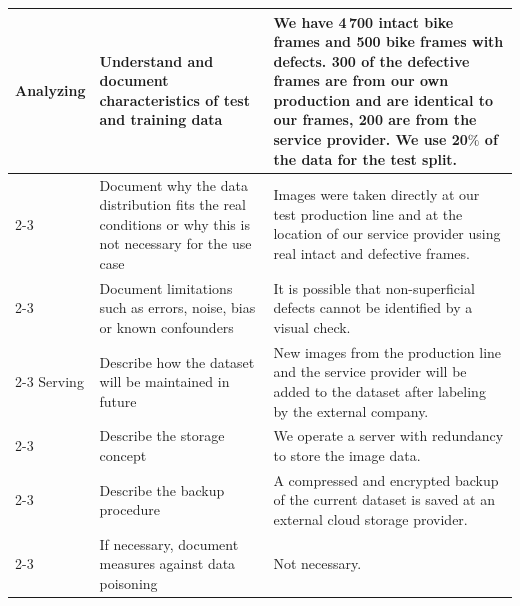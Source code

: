 {\begin{longtable}{p{0.15\linewidth}|p{0.35\linewidth}p{0.5\linewidth}}
    \hline
    Analyzing        
        & Understand and document characteristics of test and training data     &  We have 4\,700 intact bike frames and 500 bike frames with defects. 300 of the defective frames are from our own production and are identical to our frames, 200 are from the service provider. We use 20$\%$ of the data for the test split.\\\cline{2-3}   
        & Document why the data distribution fits the real conditions or why this is not necessary for the use case         &  Images were taken directly at our test production line and at the location of our service provider using real intact and defective frames.\\\cline{2-3}  
        & Document limitations such as errors, noise, bias or known confounders   &  It is possible that non-superficial defects cannot be identified by a visual check.\\\cline{2-3}  
    \hline
    Serving       
        & Describe how the dataset will be maintained in future &  New images from the production line and the service provider will be added to the dataset after labeling by the external company. \\\cline{2-3}  
        & Describe the storage concept   &   We operate a server with redundancy to store the image data.   \\\cline{2-3} 
        & Describe the backup procedure  &   A compressed and encrypted backup of the current dataset is saved at an external cloud storage provider.      \\\cline{2-3}  
        & If necessary, document measures against data poisoning                &  Not necessary.        \\
                      
    \bottomrule
\end{longtable}
}



